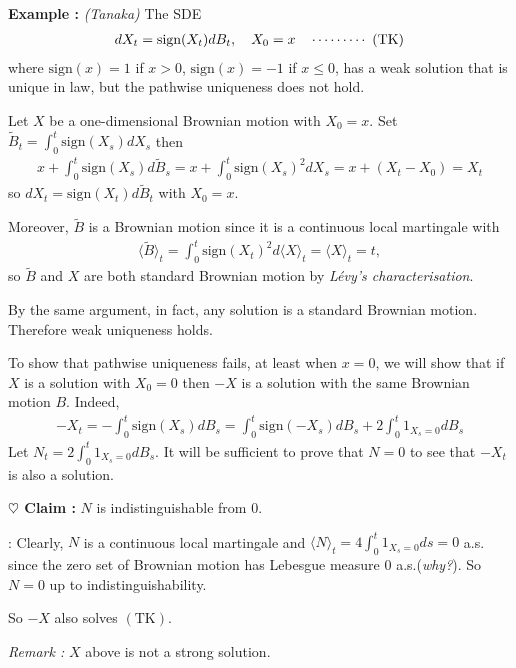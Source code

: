 \documentclass[12pt,a4paper]{article}
\newenvironment{proof}
{\begin{changemargin}{0.5cm}{0.5cm} 
	}%
	{\end{changemargin}
}
\newenvironment{subproof}
{\begin{changemargin}{0.5cm}{0.5cm} 
	}%
	{\end{changemargin}
}
\newenvironment{p}
{\begin{proof} 
	}%
	{\end{proof}
}
\begin{document}
\textbf{Example :} \emph{(Tanaka)} The SDE
\begin{align*}
dX_t = \text{sign}(X_t) dB_t, \quad X_0=x \quad \cdots\cdots\cdots\,\,(\text{TK})
\end{align*}
where $\text{sign}(x) = 1$ if $x>0$, $\text{sign}(x) =-1$ if $x\leq 0$, has a weak solution that is unique in law, but the pathwise uniqueness does not hold. 
\begin{p}
\pf Let $X$ be a one-dimensional Brownian motion with $X_0 =x$. Set $\tilde{B}_t = \int_0^t \text{sign}(X_s) dX_s$ then
\begin{align*}
x+ \int_0^t \text{sign}(X_s) d\tilde{B}_s = x+ \int_0^t \text{sign}(X_s)^2 dX_s = x + (X_t - X_0) =X_t
\end{align*}
so $dX_t = \text{sign}(X_t) d\tilde{B}_t$ with $X_0 =x$.

\quad Moreover, $\tilde{B}$ is a Brownian motion since it is a continuous local martingale with
\begin{align*}
\langle \tilde{B} \rangle_t = \int_0^t \text{sign}(X_t)^2 d\langle X\rangle_t  = \langle X\rangle_t =t,
\end{align*} 
so $\tilde{B}$ and $X$ are both standard Brownian motion by \emph{L\'evy's characterisation}.

\quad By the same argument, in fact, any solution is a standard Brownian motion. Therefore weak uniqueness holds.
\s

To show that pathwise uniqueness fails, at least when $x=0$, we will show that if $X$ is a solution with $X_0 =0$ then $-X$ is a solution with the same Brownian motion $B$. Indeed,
\begin{align*}
-X_t = -\int_0^t \text{sign}(X_s) dB_s = \int_0^t \text{sign}(-X_s) dB_s + 2\int_0^t 1_{X_s =0} dB_s
\end{align*}
Let $N_t = 2\int_0^t 1_{X_s =0} dB_s$. It will be sufficient to prove that $N =0$ to see that $-X_t$ is also a solution.

\textbf{$\heartsuit$ Claim :} $N$ is indistinguishable from 0.
\begin{subproof}
: Clearly, $N$ is a continuous local martingale and $\langle N \rangle_t = 4\int_0^t 1_{X_s =0} ds=0$ a.s. since the zero set of Brownian motion has Lebesgue measure 0 a.s.(\emph{why?}). So $N=0$ up to indistinguishability.
\end{subproof}
So $-X$ also solves $(\text{TK})$.

\eop
\end{p}
\s

\emph{Remark :} $X$ above is not a strong solution.
\s
\end{document}
